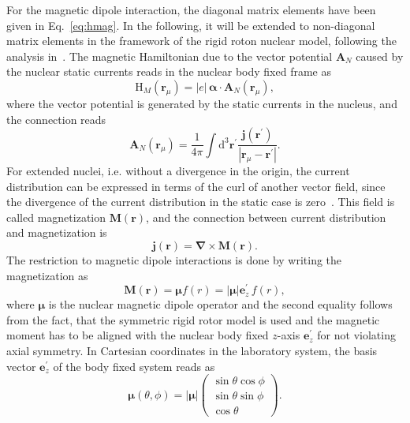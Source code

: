 For the magnetic dipole interaction, the diagonal matrix elements have been given in Eq.~\eqref{eq:hmag}. In the following, it will be extended to non-diagonal matrix elements in the framework of the rigid roton nuclear model, following the analysis in~\cite{Steffen1985}. The magnetic Hamiltonian due to the vector potential $\mathbf{A}_N$ caused by the nuclear static currents reads in the nuclear body fixed frame as
\begin{equation}
\label{eq:Hmag_rot}
\text{H}_{M}(\mathbf{r}_\mu) = |e|\,\boldsymbol{\alpha}\cdot \mathbf{A}_N(\mathbf{r}_\mu),
\end{equation}
where the vector potential is generated by the static currents in the nucleus, and the connection reads~\cite{jackson1999}
\begin{equation}
\mathbf{A}_N(\mathbf{r}_\mu) = \frac{1}{4\pi}\int\text{d}^3\mathbf{r}^\prime \frac{\mathbf{j}(\mathbf{r}^\prime)}{|\mathbf{r}_\mu-\mathbf{r}^\prime|}.
\end{equation}
For extended nuclei, i.e. without a divergence in the origin, the current distribution can be expressed in terms of the curl of another vector field, since the divergence of the current distribution in the static case is zero~\cite{jackson1999}. This field is called magnetization $\mathbf{M}(\mathbf{r})$, and the connection between current distribution and magnetization is
\begin{equation}
\mathbf{j}(\mathbf{r}) = \boldsymbol{\nabla} \times  \mathbf{M}(\mathbf{r}).
\end{equation}
The restriction to magnetic dipole interactions is done by writing the magnetization as
\begin{equation}
\mathbf{M}(\mathbf{r})=\boldsymbol{\mu}f(r)=|\boldsymbol{\mu}|\mathbf{e}_z^\prime\,f(r),
\end{equation}
where $\boldsymbol{\mu}$ is the nuclear magnetic dipole operator and the second equality follows from the fact, that the symmetric rigid rotor model is used and the magnetic moment has to be aligned with the nuclear body fixed $z$-axis $\mathbf{e}_z^\prime$ for not violating axial symmetry.
In Cartesian coordinates in the laboratory system, the basis vector $\mathbf{e}_z^\prime$ of the body fixed system reads as
\begin{equation}
\label{eq:magMomOp}
\boldsymbol{\mu}(\theta,\phi)=|\boldsymbol{\mu}|
\begin{pmatrix}
\sin\theta\cos\phi \\ \sin\theta\sin\phi \\ \cos\theta
\end{pmatrix}.
\end{equation}
